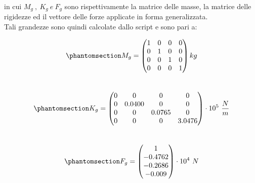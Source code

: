 \documentclass{article}
\begin{document}
        in cui $M_g \ , \ K_g \ e \ F_g$ sono rispettivamente la matrice delle masse, la matrice delle rigidezze
        ed il vettore delle forze applicate in forma generalizzata. \\ 

        Tali grandezze sono quindi calcolate dallo script \autocite{Esercitazioni_strutture} e sono pari a:

            \begin{equation}
                \phantomsection \label{equation:masse_generalizzate}
                M_g = 
                \begin{pmatrix}
                   1        & 0             &  0             &  0     \\ 
                   0        & 1             &  0             &  0     \\
                   0        & 0             &  1             &  0    \\
                   0        & 0             &  0             &  1
                \end{pmatrix} kg
            \end{equation} \\ 


            \begin{equation}
                \phantomsection \label{equation:rigidezze_generalizzate}
                K_g = 
                \begin{pmatrix}
                   0        & 0             &  0             &  0     \\ 
                   0        & 0.0400        &  0             &  0     \\
                   0        & 0             &  0.0765        &  0     \\
                   0        & 0             &  0             &  3.0476
                \end{pmatrix} \cdot 10^5 \ \frac{N}{m}
            \end{equation} \\ 


            \begin{equation}
                \phantomsection \label{equation:forze_generalizzate}
                F_g = 
                \begin{pmatrix}
                   1             \\ 
                  -0.4762        \\
                  -0.2686        \\
                  -0.009        
                \end{pmatrix} \cdot 10^4 \ N
            \end{equation}
\end{document}
